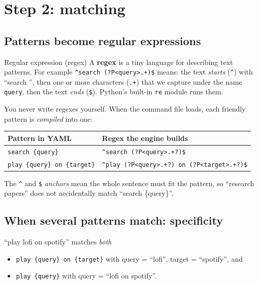 \documentclass[11pt,a4paper]{article}
\begin{document}
\section{Step 2: matching}

\subsection{Patterns become regular expressions}
\begin{concept}{Regular expression (regex)}
A \textbf{regex} is a tiny language for describing text patterns. For example
\texttt{\^{}search (?P<query>.+)\$} means: the text \emph{starts} (\texttt{\^{}}) with
``search '', then one or more characters (\texttt{.+}) that we capture under the name
\texttt{query}, then the text \emph{ends} (\texttt{\$}). Python's built-in \texttt{re} module
runs them.
\end{concept}

You never write regexes yourself. When the command file loads, each friendly pattern is
\emph{compiled} into one:

\begin{center}
\renewcommand{\arraystretch}{1.2}
\begin{tabularx}{\textwidth}{l X}
\toprule
\textbf{Pattern in YAML} & \textbf{Regex the engine builds} \\
\midrule
\texttt{search \{query\}} & \texttt{\^{}search (?P<query>.+?)\$} \\
\texttt{play \{query\} on \{target\}} & \texttt{\^{}play (?P<query>.+?) on (?P<target>.+?)\$} \\
\bottomrule
\end{tabularx}
\end{center}

\noindent The \texttt{\^{}} and \texttt{\$} \emph{anchors} mean the whole sentence must fit
the pattern, so ``research papers'' does not accidentally match ``search \{query\}''.

\subsection{When several patterns match: specificity}
``play lofi on spotify'' matches \emph{both}
\begin{itemize}[nosep]
  \item \texttt{play \{query\} on \{target\}} with query = ``lofi'', target = ``spotify'', and
  \item \texttt{play \{query\}} with query = ``lofi on spotify''.
\end{itemize}
\end{document}
